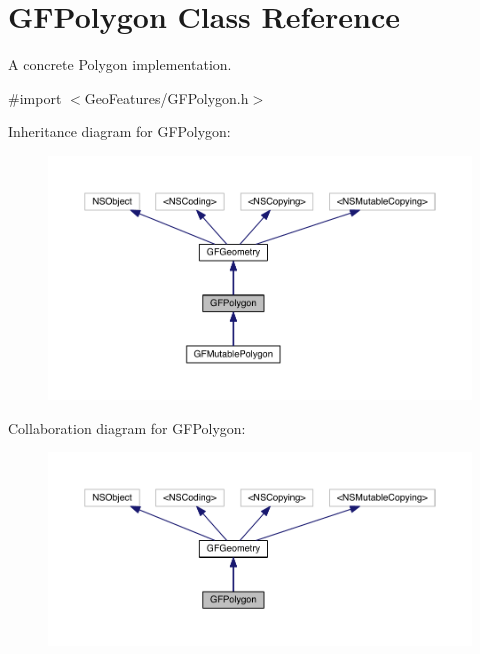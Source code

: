 \hypertarget{interface_g_f_polygon}{}\section{G\+F\+Polygon Class Reference}
\label{interface_g_f_polygon}


A concrete Polygon implementation.  




{\ttfamily \#import $<$Geo\+Features/\+G\+F\+Polygon.\+h$>$}



Inheritance diagram for G\+F\+Polygon\+:\nopagebreak
\begin{figure}[H]
\begin{center}
\leavevmode
\includegraphics[width=350pt]{interface_g_f_polygon__inherit__graph}
\end{center}
\end{figure}


Collaboration diagram for G\+F\+Polygon\+:\nopagebreak
\begin{figure}[H]
\begin{center}
\leavevmode
\includegraphics[width=350pt]{interface_g_f_polygon__coll__graph}
\end{center}
\end{figure}
